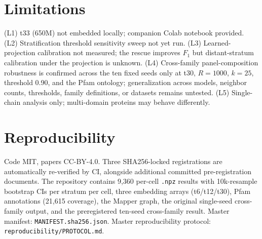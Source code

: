 \documentclass[11pt]{article}
\begin{document}
\section{Limitations}
(L1) t33 (650M) not embedded locally; companion Colab notebook provided.
(L2) Stratification threshold sensitivity sweep not yet run.
(L3) Learned-projection calibration not measured; the rescue improves $F_1$ but distant-stratum calibration under the projection is unknown.
(L4) Cross-family panel-composition robustness is confirmed across the ten fixed seeds only at t30, $R=1000$, $k=25$, threshold 0.90, and the Pfam ontology; generalization across models, neighbor counts, thresholds, family definitions, or datasets remains untested.
(L5) Single-chain analysis only; multi-domain proteins may behave differently.

\section{Reproducibility}
Code MIT, papers CC-BY-4.0. Three SHA256-locked registrations are automatically re-verified by CI, alongside additional committed pre-registration documents. The repository contains 9{,}360 per-cell \texttt{.npz} results with 10k-resample bootstrap CIs per stratum per cell, three embedding arrays (t6/t12/t30), Pfam annotations (21{,}615 coverage), the Mapper graph, the original single-seed cross-family output, and the preregistered ten-seed cross-family result. Master manifest: \texttt{MANIFEST.sha256.json}. Master reproducibility protocol: \texttt{reproducibility/PROTOCOL.md}.



\end{document}
